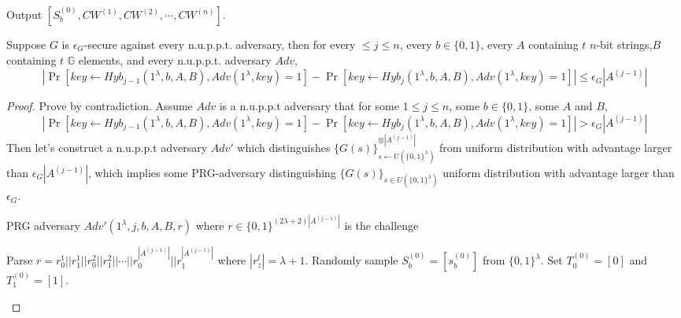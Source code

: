 \begin{algorithm}[H]
\begin{algorithmic}[1]
		\EndFor
		\item[]
		\State Output $[S_b^{(0)}, CW^{(1)},CW^{(2)},\cdots,CW^{(n)}]$.
	\end{algorithmic}
\end{algorithm}

\begin{claim}
	Suppose $G$ is $\epsilon_G$-secure against every n.u.p.p.t. adversary, then for every $\le j\le n$, every $b\in\{0,1\}$, every $A$ containing $t$ $n$-bit strings,$B$ containing $t$ $\mathbb{G}$ elements, and every  n.u.p.p.t. adversary $Adv$, 
	\[
	|\Pr[key\leftarrow Hyb_{j-1}(1^\lambda, b, A,B), Adv(1^\lambda, key) = 1]-\Pr[key\leftarrow Hyb_{j}(1^\lambda, b, A,B), Adv(1^\lambda, key) = 1]|\le\epsilon_G|A^{(j-1)}|
	\]
\end{claim}
\begin{proof}
	Prove by contradiction. Assume $Adv$ is a n.u.p.p.t adversary that for some $1\le j\le n$, some $b\in\{0,1\}$, some $A$ and $B$,
	\[
	|\Pr[key\leftarrow Hyb_{j-1}(1^\lambda, b, A,B), Adv(1^\lambda, key) = 1]-\Pr[key\leftarrow Hyb_{j}(1^\lambda, b, A,B), Adv(1^\lambda, key) = 1]|>\epsilon_G|A^{(j-1)}|
	\]
	Then let's construct a n.u.p.p.t adversary $Adv'$ which distinguishes $\{G(s)\}^{\otimes |A^{(j-1)}|}_{s\leftarrow U(\{0,1\}^\lambda)}$ from uniform distribution with advantage larger than $\epsilon_G|A^{(j-1)}|$, which implies some PRG-adversary distinguishing $\{G(s)\}_{s\in U(\{0,1\}^\lambda)}$ uniform distribution with advantage larger than $\epsilon_G$. 
	\begin{algorithm}[H]
		\begin{algorithmic}[1]
			\caption{PRG adversary $Adv'(1^\lambda, j, b,A,B,r)$ where $r\in\{0,1\}^{(2\lambda+2)|A^{(j-1)}|}$ is the challenge}
			\State Parse $r = r^1_0||r^1_1||r^2_0||r^2_1||\cdots||r^{|A^{(j-1)}|}_0||r^{|A^{(j-1)}|}_1$ where $|r^l_z| = \lambda+1$.
			\State Randomly sample $S_b^{(0)} = [s_b^{(0)}]$ from $\{0,1\}^\lambda$.
			\State Set $T_0^{(0)} = [0]$ and $T_1^{(0)} = [1]$. 
			

\end{algorithmic}
\end{algorithm}
\end{proof}

